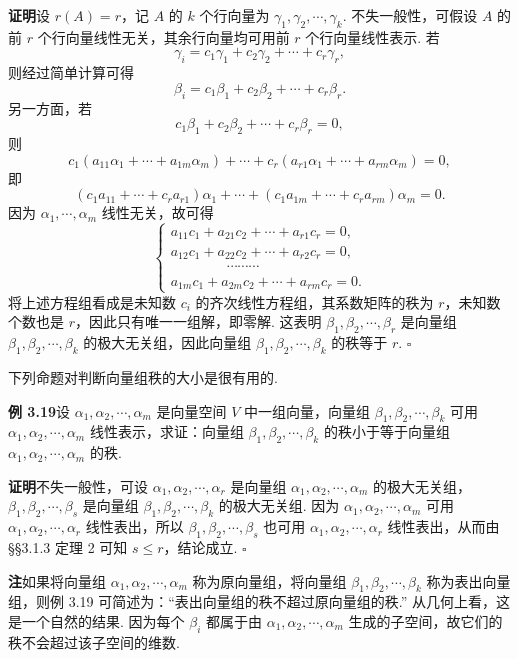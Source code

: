\documentclass[UTF8, 12pt, fontset=fandol, oneside]{ctexart}
\begin{document}
\noindent\textbf{证明}\quad 设 $r(A)=r$，记 $A$ 的 $k$ 个行向量为 $\gamma_1,\gamma_2,\cdots,\gamma_k$. 不失一般性，可假设 $A$ 的前 $r$ 个行向量线性无关，其余行向量均可用前 $r$ 个行向量线性表示. 若
\[
\gamma_i=c_1\gamma_1+c_2\gamma_2+\cdots+c_r\gamma_r,
\]
则经过简单计算可得
\[
\beta_i=c_1\beta_1+c_2\beta_2+\cdots+c_r\beta_r.
\]
另一方面，若
\[
c_1\beta_1+c_2\beta_2+\cdots+c_r\beta_r=0,
\]
则
\[
c_1(a_{11}\alpha_1+\cdots+a_{1m}\alpha_m)+\cdots+c_r(a_{r1}\alpha_1+\cdots+a_{rm}\alpha_m)=0,
\]
即
\[
(c_1a_{11}+\cdots+c_ra_{r1})\alpha_1+\cdots+(c_1a_{1m}+\cdots+c_ra_{rm})\alpha_m=0.
\]
因为 $\alpha_1,\cdots,\alpha_m$ 线性无关，故可得
\[
\left\{
\begin{array}{l}
a_{11}c_1+a_{21}c_2+\cdots+a_{r1}c_r=0,\\
a_{12}c_1+a_{22}c_2+\cdots+a_{r2}c_r=0,\\
\hspace{4em}\cdots\cdots\cdots\\
a_{1m}c_1+a_{2m}c_2+\cdots+a_{rm}c_r=0.
\end{array}
\right.
\]
将上述方程组看成是未知数 $c_i$ 的齐次线性方程组，其系数矩阵的秩为 $r$，未知数个数也是 $r$，因此只有唯一一组解，即零解. 这表明 $\beta_1,\beta_2,\cdots,\beta_r$ 是向量组 $\beta_1,\beta_2,\cdots,\beta_k$ 的极大无关组，因此向量组 $\beta_1,\beta_2,\cdots,\beta_k$ 的秩等于 $r$. $\square$

下列命题对判断向量组秩的大小是很有用的.

\noindent\textbf{例 3.19}\quad 设 $\alpha_1,\alpha_2,\cdots,\alpha_m$ 是向量空间 $V$ 中一组向量，向量组 $\beta_1,\beta_2,\cdots,\beta_k$ 可用 $\alpha_1,\alpha_2,\cdots,\alpha_m$ 线性表示，求证：向量组 $\beta_1,\beta_2,\cdots,\beta_k$ 的秩小于等于向量组 $\alpha_1,\alpha_2,\cdots,\alpha_m$ 的秩.

\noindent\textbf{证明}\quad 不失一般性，可设 $\alpha_1,\alpha_2,\cdots,\alpha_r$ 是向量组 $\alpha_1,\alpha_2,\cdots,\alpha_m$ 的极大无关组，$\beta_1,\beta_2,\cdots,\beta_s$ 是向量组 $\beta_1,\beta_2,\cdots,\beta_k$ 的极大无关组. 因为 $\alpha_1,\alpha_2,\cdots,\alpha_m$ 可用 $\alpha_1,\alpha_2,\cdots,\alpha_r$ 线性表出，所以 $\beta_1,\beta_2,\cdots,\beta_s$ 也可用 $\alpha_1,\alpha_2,\cdots,\alpha_r$ 线性表出，从而由 §§3.1.3 定理 2 可知 $s\le r$，结论成立. $\square$

\noindent\textbf{注}\quad 如果将向量组 $\alpha_1,\alpha_2,\cdots,\alpha_m$ 称为原向量组，将向量组 $\beta_1,\beta_2,\cdots,\beta_k$ 称为表出向量组，则例 3.19 可简述为：“表出向量组的秩不超过原向量组的秩.” 从几何上看，这是一个自然的结果. 因为每个 $\beta_i$ 都属于由 $\alpha_1,\alpha_2,\cdots,\alpha_m$ 生成的子空间，故它们的秩不会超过该子空间的维数.
\end{document}
